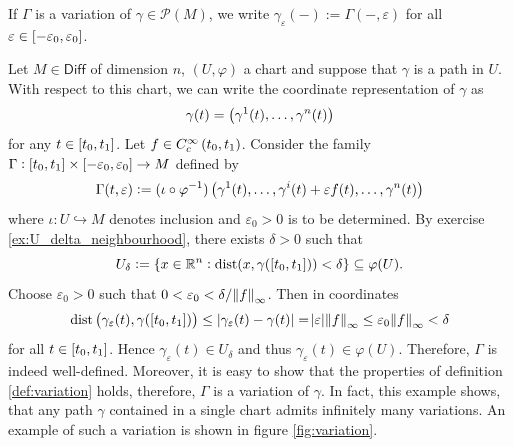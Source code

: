\begin{remark}
	If $\Gamma$ is a variation of $\gamma \in \mathcal{P}(M)$, we write $\gamma_\varepsilon(-) := \Gamma(-,\varepsilon)$ for all $\varepsilon \in \intcc[0]{-\varepsilon_0,\varepsilon_0}$.
\end{remark}

\begin{example}
	Let $M \in \mathsf{Diff}$ of dimension $n$, $(U,\varphi)$ a chart and suppose that $\gamma$ is a path in $U$. With respect to this chart, we can write the coordinate representation of $\gamma$ as
	\begin{equation*}
		\gamma(t) = \del[1]{\gamma^1(t),\dots,\gamma^n(t)}
	\end{equation*}
	\noindent for any $t \in \intcc[0]{t_0,t_1}$. Let $f \in C^\infty_c\intoo[0]{t_0,t_1}$. Consider the family $\Gamma : \intcc[0]{t_0,t_1} \times \intcc[0]{-\varepsilon_0,\varepsilon_0} \to M$ defined by
	\begin{equation*}
		\Gamma(t,\varepsilon) := (\iota \circ \varphi^{-1})\del[1]{\gamma^1(t),\dots,\gamma^i(t) + \varepsilon f(t),\dots,\gamma^n(t)}
	\end{equation*}
	\noindent where $\iota : U \hookrightarrow M$ denotes inclusion and $\varepsilon_0 > 0$ is to be determined. By exercise \ref{ex:U_delta_neighbourhood}, there exists $\delta > 0$ such that
	\begin{equation*}
		U_\delta := \cbr[0]{x \in \mathbb{R}^n : \dist(x,\gamma(\intcc[0]{t_0,t_1})) < \delta} \subseteq \varphi(U).
	\end{equation*}
	Choose $\varepsilon_0 > 0$ such that $0 < \varepsilon_0 < \delta/\norm{f}_\infty$. Then in coordinates
	\begin{equation*}
		\dist\del[1]{\gamma_\varepsilon(t), \gamma(\intcc[0]{t_0,t_1})} \leq \abs[0]{\gamma_\varepsilon(t) - \gamma(t)} = \abs{\varepsilon} \norm{f}_\infty \leq \varepsilon_0 \norm{f}_\infty < \delta 
	\end{equation*}
	\noindent for all $t \in \intcc[0]{t_0,t_1}$. Hence $\gamma_\varepsilon(t) \in U_\delta$ and thus $\gamma_\varepsilon(t) \in \varphi(U)$. Therefore, $\Gamma$ is indeed well-defined. Moreover, it is easy to show that the properties of definition \ref{def:variation} holds, therefore, $\Gamma$ is a variation of $\gamma$. In fact, this example shows, that any path $\gamma$ contained in a single chart admits infinitely many variations. An example of such a variation is shown in figure \ref{fig:variation}.


\end{example}
